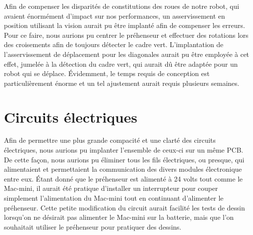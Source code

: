 Afin de compenser les disparités de constitutions des roues de notre robot, qui avaient énormément d'impact sur nos performances, un asservissement en position utilisant la vision aurait pu être implanté afin de compenser les erreurs. Pour ce faire, nous aurions pu centrer le préhenseur et effectuer des rotations lors des croisements afin de toujours détecter le cadre vert. L'implantation de l'asservissement de déplacement pour les diagonales aurait pu être employée à cet effet, jumelée à la détection du cadre vert, qui aurait dû être adaptée pour un robot qui se déplace. Évidemment, le temps requis de conception est particulièrement énorme et un tel ajustement aurait requis plusieurs semaines. 

\section{Circuits électriques}

Afin de permettre une plus grande compacité et une clarté des circuits électriques, nous aurions pu implanter l’ensemble de ceux-ci sur un même PCB. De cette façon, nous aurions pu éliminer tous les fils électriques, ou presque, qui alimentaient et permettaient la communication des divers modules électronique entre eux. Étant donné que le préhenseur est alimenté à 24 volts tout comme le Mac-mini, il aurait été pratique d’installer un interrupteur pour couper simplement l’alimentation du Mac-mini tout en continuant d’alimenter le préhenseur. Cette petite modification du circuit aurait facilité les tests de dessin lorsqu’on ne désirait pas alimenter le Mac-mini sur la batterie, mais que l’on souhaitait utiliser le préhenseur pour pratiquer des dessins.

